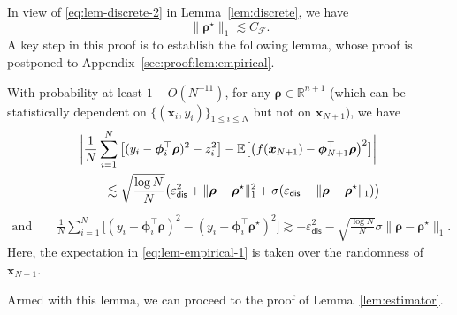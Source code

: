 \documentclass[english]{article}
\begin{document}
In view of \eqref{eq:lem-discrete-2} in Lemma~\ref{lem:discrete}, we have
$$\|{\bm \rho}^{\star}\|_1\lesssim C_{\mathcal{F}}.$$
%
A key step in this proof is to establish the following lemma, whose proof is postponed to Appendix~\ref{sec:proof:lem:empirical}.
%
\begin{lemma} \label{lem:empirical}
With probability at least $1-O(N^{-11})$, for any ${\bm \rho} \in \mathbb{R}^{n+1}$ (which can be statistically dependent on $\{(\bm{x}_i,y_i)\}_{1\leq i\leq N}$ but not on $\bm{x}_{N+1}$), we have
%
\begin{align}\label{eq:lem-empirical-1}
& \bigg|\frac{1}{N}\sum_{i = 1}^N \big[(y_i - {\bm \phi}_i^{\top}{\bm \rho})^2 - z_i^2\big] - \mathbb{E}\big[\big(f({\bm x}_{N+1}) - {\bm \phi}_{N+1}^{\top}{\bm \rho}\big)^2\big]\bigg| \notag\\
&\qquad \lesssim \sqrt{\frac{\log N}{N}}\big(\varepsilon_{\mathsf{dis}}^2 + \|{\bm \rho}-{\bm \rho}^{\star}\|_1^2 + \sigma(\varepsilon_{\mathsf{dis}} + \|{\bm \rho}-{\bm \rho}^{\star}\|_1)\big)
\end{align}
%
%
\begin{align}\label{eq:lem-empirical-2}
\text{and} 
\qquad 
\frac{1}{N}\sum_{i = 1}^N \big[(y_i - {\bm \phi}_i^{\top}{\bm \rho})^2 - (y_i - {\bm \phi}_i^{\top}{{\bm \rho}}^{\star})^2\big] \gtrsim  - \varepsilon_{\mathsf{dis}}^2-\sqrt{\frac{\log N}{N}}\sigma\|{\bm \rho}-{{\bm \rho}}^{\star}\|_1.
\end{align}
Here, the expectation in \eqref{eq:lem-empirical-1} is taken over the randomness of $\bm{x}_{N+1}$. 
\end{lemma}

Armed with this lemma, we can proceed to the proof of Lemma~\ref{lem:estimator}. 
\end{document}
